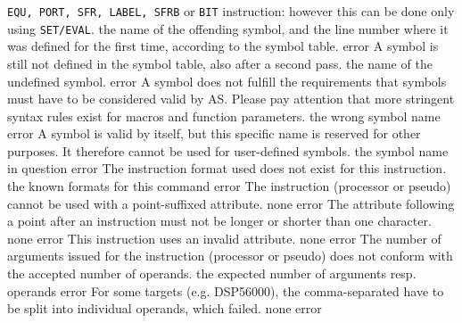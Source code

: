 \documentclass[12pt,twoside]{report}
\newcommand{\tty}[1]{{\tt #1}}
\newcommand{\asname}{{AS}}
\begin{document}
\begin{description}
{                \tty{EQU, PORT, SFR, LABEL, SFRB} or \tty{BIT} instruction: however this
                can be done only using \tty{SET/EVAL}.}
               {the name of the offending symbol, and the line number where
                it was defined for the first time, according to the symbol
                table.}
               {error}
               {A symbol is still not defined in the symbol table, also
                after a second pass.}
               {the name of the undefined symbol.}
               {error}
               {A symbol does not fulfill the requirements that symbols
                must have to be considered valid by \asname{}. Please pay
                attention that more stringent syntax rules exist for
                macros and function parameters.}
               {the wrong symbol name}
               {error}
               {A symbol is valid by itself, but this specific name is reserved
                for other purposes.  It therefore cannot be used for user-defined
                symbols.}
               {the symbol name in question}
               {error}
               {The instruction format used does not exist for this
                instruction.}
               {the known formats for this command}
               {error}
               {The instruction (processor or pseudo) cannot be used with a
                point-suffixed attribute.}
               {none}
               {error}
               {The attribute following a point after an instruction must
                not be longer or shorter than one character.}
               {none}
               {error}
               {This instruction uses an invalid attribute.}
               {none}
               {error}
               {The number of arguments issued for the instruction (processor or
                pseudo) does not conform with the accepted number of
                operands.}
               {the expected number of arguments resp. operands}
               {error}
               {For some targets (e.g. DSP56000), the
                comma-separated have to be split into individual
                operands, which failed.}
               {none}
               {error}

\end{description}
\end{document}
